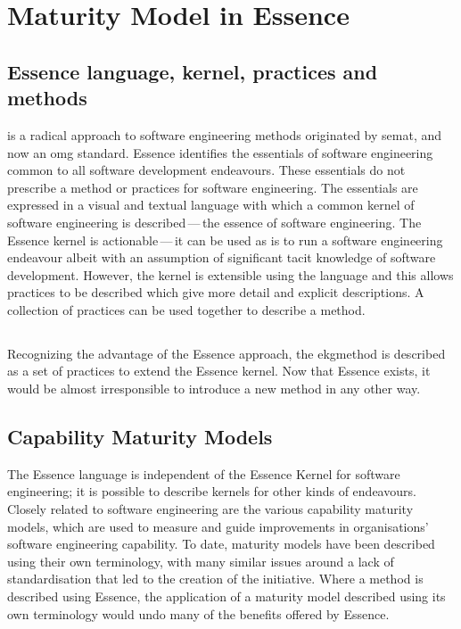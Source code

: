 \pagebreak
\chapter{Maturity Model in Essence}\label{ch:maturity-model-in-essence}

\section{Essence language, kernel, practices and methods}\label{subsec:essence-language-kernel-practices-and-methods}

 is a radical approach to software engineering methods originated by \gls{semat},
and now an \gls{omg}\autocite{omgwebsite} standard.
Essence identifies the essentials of software engineering common to all software development endeavours.
These essentials do not prescribe a method or practices for software engineering.
The essentials are expressed in a visual and textual language with which a common kernel of software engineering
is described\,---\,the essence of software engineering.
The Essence kernel is actionable\,---\,it can be used as is to run a software engineering endeavour albeit
with an assumption of significant tacit knowledge of software development.
However, the kernel is extensible using the language and this allows practices to be described which give more detail
and explicit descriptions.
A collection of practices can be used together to describe a method.

\section{}\label{subsec:ekg-method}

Recognizing the advantage of the Essence approach, the \agnos \gls{ekgmethod} is described as
a set of practices to extend the Essence kernel.
Now that Essence exists, it would be almost irresponsible to introduce a new method in any other way.

\section{Capability Maturity Models}\label{subsec:capability-maturity-models}

The Essence language is independent of the Essence Kernel for software engineering;
it is possible to describe kernels for other kinds of endeavours.
Closely related to software engineering are the various capability maturity models, which are used to measure and
guide improvements in organisations' software engineering capability.
To date, maturity models have been described using their own terminology, with many similar issues around a lack of
standardisation that led to the creation of the  initiative.
Where a method is described using Essence, the application of a maturity model described using its own
terminology would undo many of the benefits offered by Essence.

